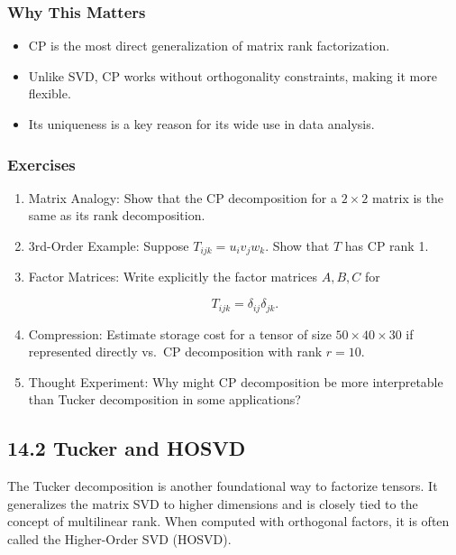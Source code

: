\documentclass[
  letterpaper,
  DIV=11,
  numbers=noendperiod]{scrreprt}
\providecommand{\tightlist}{%
  \setlength{\itemsep}{0pt}\setlength{\parskip}{0pt}}
\begin{document}
\subsubsection{Why This Matters}\label{why-this-matters-35}

\begin{itemize}
\tightlist
\item
  CP is the most direct generalization of matrix rank factorization.
\item
  Unlike SVD, CP works without orthogonality constraints, making it more
  flexible.
\item
  Its uniqueness is a key reason for its wide use in data analysis.
\end{itemize}

\subsubsection{Exercises}\label{exercises-49}

\begin{enumerate}
\def\labelenumi{\arabic{enumi}.}
\item
  Matrix Analogy: Show that the CP decomposition for a \(2 \times 2\)
  matrix is the same as its rank decomposition.
\item
  3rd-Order Example: Suppose \(T_{ijk} = u_i v_j w_k\). Show that \(T\)
  has CP rank 1.
\item
  Factor Matrices: Write explicitly the factor matrices \(A,B,C\) for

  \[
  T_{ijk} = \delta_{ij}\delta_{jk}.
  \]
\item
  Compression: Estimate storage cost for a tensor of size
  \(50 \times 40 \times 30\) if represented directly vs.~CP
  decomposition with rank \(r=10\).
\item
  Thought Experiment: Why might CP decomposition be more interpretable
  than Tucker decomposition in some applications?
\end{enumerate}

\subsection{14.2 Tucker and HOSVD}\label{tucker-and-hosvd}

The Tucker decomposition is another foundational way to factorize
tensors. It generalizes the matrix SVD to higher dimensions and is
closely tied to the concept of multilinear rank. When computed with
orthogonal factors, it is often called the Higher-Order SVD (HOSVD).
\end{document}
